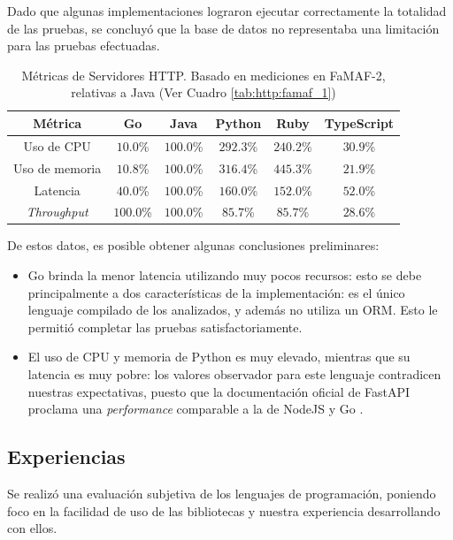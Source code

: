 \documentclass[11pt]{article}
\let\Oldsubsection\subsection
\renewcommand{\subsection}{\FloatBarrier\Oldsubsection}
\newcommand{\english}[1]{\textit{#1}}
\begin{document}
Dado que algunas implementaciones lograron ejecutar correctamente la totalidad de las pruebas, se concluyó que la base de datos no representaba una limitación para las pruebas efectuadas.

\begin{table}[h]
\centering
\begin{tabular}{|c|c|c|c|c|c|}
\hline
Métrica & Go       & Java     & Python   & Ruby     & TypeScript \\ \hline
Uso de CPU   & $10.0$\%  & $100.0$\% & $292.3$\% & $240.2$\% & $30.9$\%    \\ \hline
Uso de memoria  & $10.8$\%  & $100.0$\% & $316.4$\% & $445.3$\% & $21.9$\%    \\ \hline
Latencia     & $40.0$\%  & $100.0$\% & $160.0$\% & $152.0$\% & $52.0$\%    \\ \hline
\textit{Throughput} & $100.0$\% & $100.0$\% & $85.7$\%  & $85.7$\%  & $28.6$\%    \\ \hline
\end{tabular}
\caption{Métricas de Servidores HTTP. Basado en mediciones en FaMAF-2, relativas a Java (Ver Cuadro \ref{tab:http:famaf_1})}
\label{tab:http:metrics}
\end{table}

De estos datos, es posible obtener algunas conclusiones preliminares:

\begin{itemize}
    \item Go brinda la menor latencia utilizando muy pocos recursos: esto se debe principalmente a dos características de la implementación: es el único lenguaje compilado de los analizados, y además no utiliza un ORM. Esto le permitió completar las pruebas satisfactoriamente.

    \item El uso de CPU y memoria de Python es muy elevado, mientras que su latencia es muy pobre: los valores observador para este lenguaje contradicen nuestras expectativas, puesto que la documentación oficial de FastAPI proclama una \english{performance} comparable a la de NodeJS \cite{js:runtime:node} y Go \cite{http:fastapi_performance}.
\end{itemize}

\subsection{Experiencias}

Se realizó una evaluación subjetiva de los lenguajes de programación, poniendo foco en la facilidad de uso de las bibliotecas y nuestra experiencia desarrollando con ellos.
\end{document}
